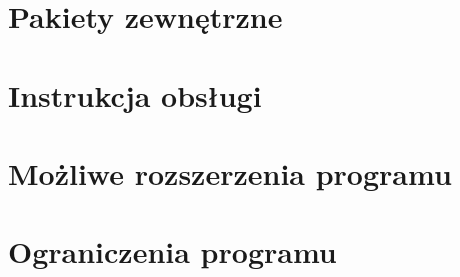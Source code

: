 \documentclass{article}
\begin{document}
\section{Pakiety zewnętrzne}

\section{Instrukcja obsługi}

\section{Możliwe rozszerzenia programu}

\section{Ograniczenia programu}
\end{document}
